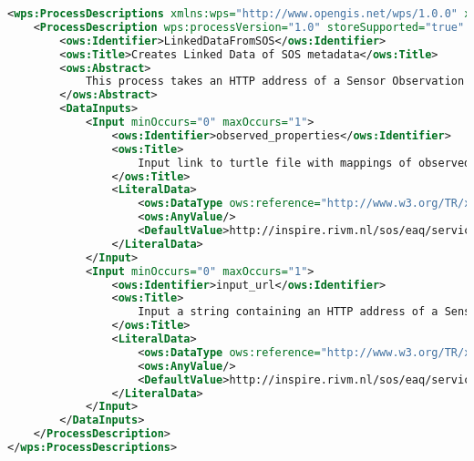 \begin{lstlisting}[language=xml]
	<wps:ProcessDescriptions xmlns:wps="http://www.opengis.net/wps/1.0.0" xmlns:ows="http://www.opengis.net/ows/1.1" xmlns:xlink="http://www.w3.org/1999/xlink" xmlns:xsi="http://www.w3.org/2001/XMLSchema-instance" xsi:schemaLocation="http://www.opengis.net/wps/1.0.0 http://schemas.opengis.net/wps/1.0.0/wpsDescribeProcess_response.xsd" service="WPS" version="1.0.0" xml:lang="en-CA">
	<ProcessDescription wps:processVersion="1.0" storeSupported="true" statusSupported="false">
		<ows:Identifier>LinkedDataFromSOS</ows:Identifier>
		<ows:Title>Creates Linked Data of SOS metadata</ows:Title>
		<ows:Abstract>
			This process takes an HTTP address of a Sensor Observation Service (SOS) as input and converts the metadata to linked data.
		</ows:Abstract>
		<DataInputs>
			<Input minOccurs="0" maxOccurs="1">
				<ows:Identifier>observed_properties</ows:Identifier>
				<ows:Title>
					Input link to turtle file with mappings of observed property identifiers to DBPedia URIs
				</ows:Title>
				<LiteralData>
					<ows:DataType ows:reference="http://www.w3.org/TR/xmlschema-2/#string">string</ows:DataType>
					<ows:AnyValue/>
					<DefaultValue>http://inspire.rivm.nl/sos/eaq/service?</DefaultValue>
				</LiteralData>
			</Input>
			<Input minOccurs="0" maxOccurs="1">
				<ows:Identifier>input_url</ows:Identifier>
				<ows:Title>
					Input a string containing an HTTP address of a Sensor Observation Service (SOS). For example: 'http://someaddress.com/sos?'
				</ows:Title>
				<LiteralData>
					<ows:DataType ows:reference="http://www.w3.org/TR/xmlschema-2/#string">string</ows:DataType>
					<ows:AnyValue/>
					<DefaultValue>http://inspire.rivm.nl/sos/eaq/service?</DefaultValue>
				</LiteralData>
			</Input>
		</DataInputs>
	</ProcessDescription>
</wps:ProcessDescriptions>
\end{lstlisting}

\clearpage

